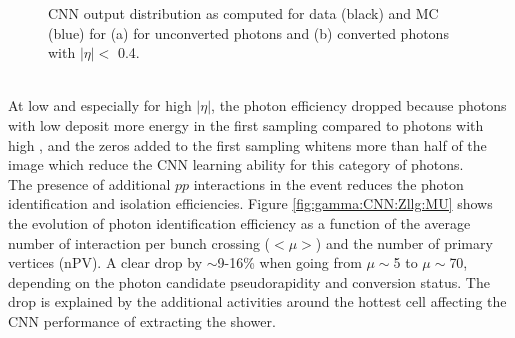 \begin{figure}[h!]
   \centering
	\begin{tcolorbox}[colback=black!5!white,colframe=white!75!black]
    \caption{CNN output distribution as computed for data (black) and MC (blue) for (a) for unconverted photons and (b) converted photons with $|\eta| < $ 0.4.}
    \label{fig:gamma:CNN:Zllg:CNNOutput}
    \end{tcolorbox}
\end{figure}
\\
At low \eT and especially for high $|\eta|$, the photon efficiency dropped because photons with low \eT deposit more energy in the first sampling compared to photons with high \eT, and the zeros added to the first sampling whitens more than half of the image which reduce the CNN learning ability for this category of photons. \\
The presence of additional $pp$ interactions in the event reduces the photon identification and isolation efficiencies. Figure \ref{fig:gamma:CNN:Zllg:MU} shows the evolution of photon identification efficiency as a function of the average number of interaction per bunch crossing ($<\mu>$) and the number of primary vertices (nPV). A clear drop by $\sim$9-16\% when going from $\mu\sim$5 to $\mu\sim$70, depending on the photon candidate pseudorapidity and conversion status. The drop is explained by the additional activities around the hottest cell affecting the CNN performance of extracting the shower. 
